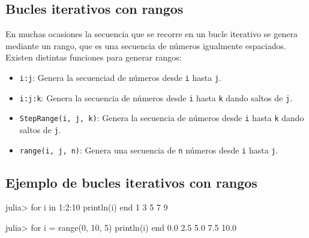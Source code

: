 \documentclass[
  letterpaper,
  DIV=11,
  numbers=noendperiod]{scrreprt}
\newenvironment{Shaded}{\begin{snugshade}}{\end{snugshade}}
\newcommand{\ControlFlowTok}[1]{\textcolor[rgb]{0.00,0.23,0.31}{#1}}
\newcommand{\FloatTok}[1]{\textcolor[rgb]{0.68,0.00,0.00}{#1}}
\newcommand{\FunctionTok}[1]{\textcolor[rgb]{0.28,0.35,0.67}{#1}}
\newcommand{\KeywordTok}[1]{\textcolor[rgb]{0.00,0.23,0.31}{#1}}
\newcommand{\NormalTok}[1]{\textcolor[rgb]{0.00,0.23,0.31}{#1}}
\newcommand{\OperatorTok}[1]{\textcolor[rgb]{0.37,0.37,0.37}{#1}}
\providecommand{\tightlist}{%
  \setlength{\itemsep}{0pt}\setlength{\parskip}{0pt}}\usepackage{longtable,booktabs,array}
\begin{document}
\hypertarget{bucles-iterativos-con-rangos}{%
\subsection{Bucles iterativos con
rangos}\label{bucles-iterativos-con-rangos}}

En muchas ocasiones la secuencia que se recorre en un bucle iterativo se
genera mediante un rango, que es una secuencia de números igualmente
espaciados. Existen distintas funciones para generar rangos:

\begin{itemize}
\tightlist
\item
  \texttt{i:j}: Genera la secuenciad de números desde \texttt{i} hasta
  \texttt{j}.
\item
  \texttt{i:j:k}: Genera la secuencia de números desde \texttt{i} hasta
  \texttt{k} dando saltos de \texttt{j}.
\item
  \texttt{StepRange(i,\ j,\ k)}: Genera la secuencia de números desde
  \texttt{i} hasta \texttt{k} dando saltos de \texttt{j}.
\item
  \texttt{range(i,\ j,\ n)}: Genera una secuencia de \texttt{n} números
  desde \texttt{i} hasta \texttt{j}.
\end{itemize}

\hypertarget{ejemplo-de-bucles-iterativos-con-rangos}{%
\subsection{Ejemplo de bucles iterativos con
rangos}\label{ejemplo-de-bucles-iterativos-con-rangos}}

\begin{Shaded}
\begin{Highlighting}[]
\NormalTok{julia}\OperatorTok{\textgreater{}} \ControlFlowTok{for}\NormalTok{ i }\KeywordTok{in} \FloatTok{1}\OperatorTok{:}\FloatTok{2}\OperatorTok{:}\FloatTok{10}
         \FunctionTok{println}\NormalTok{(i)}
       \ControlFlowTok{end}
\FloatTok{1}
\FloatTok{3}
\FloatTok{5}
\FloatTok{7}
\FloatTok{9}

\NormalTok{julia}\OperatorTok{\textgreater{}} \ControlFlowTok{for}\NormalTok{ i }\OperatorTok{=} \FunctionTok{range}\NormalTok{(}\FloatTok{0}\NormalTok{, }\FloatTok{10}\NormalTok{, }\FloatTok{5}\NormalTok{)}
         \FunctionTok{println}\NormalTok{(i)}
       \ControlFlowTok{end}
\FloatTok{0.0}
\FloatTok{2.5}
\FloatTok{5.0}
\FloatTok{7.5}
\FloatTok{10.0}
\end{Highlighting}
\end{Shaded}
\end{document}
